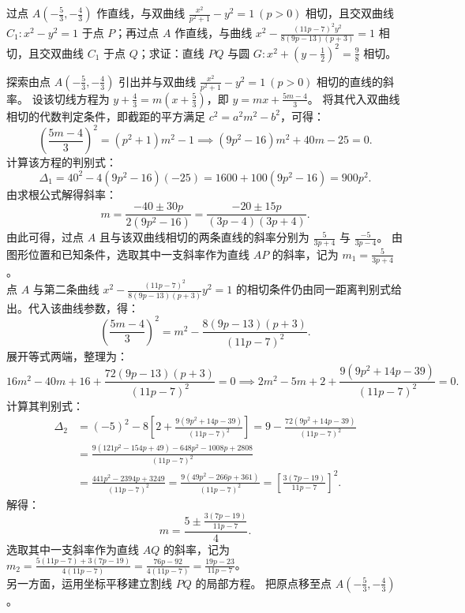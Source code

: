 \begin{example}
过点 \(A\left(-\frac{5}{3}, -\frac{4}{3}\right)\) 作直线，与双曲线 \(\frac{x^2}{p^2 + 1} - y^2 = 1\ (p > 0)\) 相切，且交双曲线 \(C_1: x^2 - y^2 = 1\) 于点 \(P\)；再过点 \(A\) 作直线，与曲线 \(x^2 - \frac{(11p - 7)^2 y^2}{8(9p - 13)(p + 3)} = 1\) 相切，且交双曲线 \(C_1\) 于点 \(Q\)；求证：直线 \(PQ\) 与圆 \(G: x^2 + \left(y - \frac{1}{2}\right)^2 = \frac{9}{8}\) 相切。
\end{example}
\begin{solution}
探索由点 $A\left(-\frac{5}{3}, -\frac{4}{3}\right)$ 引出并与双曲线 $\frac{x^2}{p^2 + 1} - y^2 = 1\ (p > 0)$ 相切的直线的斜率。
设该切线方程为 $y + \frac{4}{3} = m\left(x + \frac{5}{3}\right)$，即 $y = mx + \frac{5m - 4}{3}$。
将其代入双曲线相切的代数判定条件，即截距的平方满足 $c^2 = a^2 m^2 - b^2$，可得：
\[ \left(\frac{5m - 4}{3}\right)^2 = (p^2 + 1)m^2 - 1\implies (9p^2 - 16)m^2 + 40m - 25 = 0. \]
计算该方程的判别式：
\[ \Delta_1 = 40^2 - 4(9p^2 - 16)(-25) = 1600 + 100(9p^2 - 16) = 900p^2. \]
由求根公式解得斜率：
\[ m = \frac{-40 \pm 30p}{2(9p^2 - 16)} = \frac{-20 \pm 15p}{(3p - 4)(3p + 4)}. \]
由此可得，过点 $A$ 且与该双曲线相切的两条直线的斜率分别为 $\frac{5}{3p + 4}$ 与 $\frac{-5}{3p - 4}$。
由图形位置和已知条件，选取其中一支斜率作为直线 $AP$ 的斜率，记为 $m_1 = \frac{5}{3p + 4}$。\\
点 $A$ 与第二条曲线 $x^2 - \frac{(11p - 7)^2}{8(9p - 13)(p + 3)} y^2 = 1$ 的相切条件仍由同一距离判别式给出。代入该曲线参数，得：
\[ \left(\frac{5m - 4}{3}\right)^2 = m^2 - \frac{8(9p - 13)(p + 3)}{(11p - 7)^2}. \]
展开等式两端，整理为：
\[ 16m^2 - 40m + 16 + \frac{72(9p - 13)(p + 3)}{(11p - 7)^2} = 0 \implies 2m^2 - 5m + 2 + \frac{9(9p^2 + 14p - 39)}{(11p - 7)^2} = 0. \]
计算其判别式：
\begin{align*}
\Delta_2 &= (-5)^2 - 8\left[2 + \frac{9(9p^2 + 14p - 39)}{(11p - 7)^2}\right] = 9 - \frac{72(9p^2 + 14p - 39)}{(11p - 7)^2} \\
&= \frac{9(121p^2 - 154p + 49) - 648p^2 - 1008p + 2808}{(11p - 7)^2} \\
&= \frac{441p^2 - 2394p + 3249}{(11p - 7)^2} = \frac{9(49p^2 - 266p + 361)}{(11p - 7)^2} = \left[\frac{3(7p - 19)}{11p - 7}\right]^2.
\end{align*}
解得：
\[ m = \frac{5 \pm \frac{3(7p - 19)}{11p - 7}}{4}. \]
选取其中一支斜率作为直线 $AQ$ 的斜率，记为 $m_2 = \frac{5(11p - 7) + 3(7p - 19)}{4(11p - 7)} = \frac{76p - 92}{4(11p - 7)} = \frac{19p - 23}{11p - 7}$。\\
另一方面，运用坐标平移建立割线 $PQ$ 的局部方程。
把原点移至点 $A\left(-\frac{5}{3}, -\frac{4}{3}\right)$。

\end{solution}
